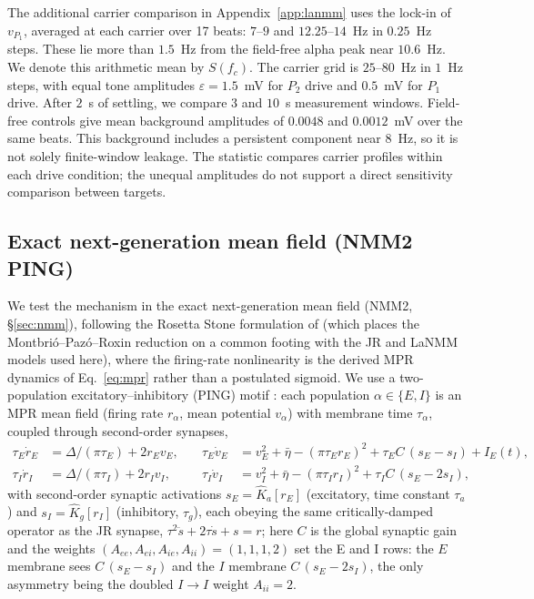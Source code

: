 \documentclass[11pt,a4paper]{article}
\begin{document}
The additional carrier comparison in Appendix~\ref{app:lanmm} uses the lock-in
of $v_{P_1}$, averaged at each carrier over 17 beats: $7$--$9$ and
$12.25$--$14$~Hz in $0.25$~Hz steps. These lie more than $1.5$~Hz from the
field-free alpha peak near $10.6$~Hz. We denote this arithmetic mean by $S(f_c)$.
The carrier grid is $25$--$80$~Hz in $1$~Hz steps, with equal tone amplitudes
$\varepsilon=1.5$~mV for $P_2$ drive and $0.5$~mV for $P_1$ drive. After $2$~s
of settling, we compare $3$ and $10$~s measurement windows. Field-free controls
give mean background amplitudes of $0.0048$ and $0.0012$~mV over the same beats.
This background includes a persistent component near $8$~Hz, so it is not solely
finite-window leakage. The statistic compares carrier profiles within each drive
condition; the unequal amplitudes do not support a direct sensitivity comparison
between targets.

\subsection{Exact next-generation mean field (NMM2 PING)}
We test the mechanism in the exact next-generation mean field (NMM2, \S\ref{sec:nmm}),
following the Rosetta Stone formulation of \cite{ruffini2025rosetta} (which places the
Montbri\'o--Paz\'o--Roxin reduction \cite{montbrio2015} on a common footing with the JR
and LaNMM models used here), where the firing-rate nonlinearity is the derived MPR
dynamics of Eq.~\eqref{eq:mpr} rather than a postulated sigmoid. We use a two-population
excitatory--inhibitory (PING) motif \cite{ruffini2021nmm2,clusella2023,ruffini2025rosetta}:
each population $\alpha\in\{E,I\}$ is an MPR mean field (firing rate $r_\alpha$, mean
potential $v_\alpha$) with membrane time $\tau_\alpha$, coupled through second-order
synapses,
\begin{equation}
\begin{aligned}
\tau_E\dot r_E&=\Delta/(\pi\tau_E)+2r_Ev_E, &\quad
\tau_E\dot v_E&=v_E^2+\bar\eta-(\pi\tau_E r_E)^2+\tau_E C\,(s_E-s_I)+I_E(t),\\[2pt]
\tau_I\dot r_I&=\Delta/(\pi\tau_I)+2r_Iv_I, &\quad
\tau_I\dot v_I&=v_I^2+\bar\eta-(\pi\tau_I r_I)^2+\tau_I C\,(s_E-2s_I),
\end{aligned}
\label{eq:nmm2-ping}
\end{equation}
with second-order synaptic activations $s_E=\hat K_a[r_E]$ (excitatory, time constant
$\tau_a$) and $s_I=\hat K_g[r_I]$ (inhibitory, $\tau_g$), each obeying the same
critically-damped operator as the JR synapse, $\tau^2\ddot s+2\tau\dot s+s=r$; here $C$
is the global synaptic gain and the weights $(A_{ee},A_{ei},A_{ie},A_{ii})=(1,1,1,2)$
set the E and I rows: the $E$ membrane sees $C\,(s_E-s_I)$ and the $I$ membrane
$C\,(s_E-2s_I)$, the only asymmetry being the doubled $I\!\to\!I$ weight $A_{ii}=2$.
\end{document}
